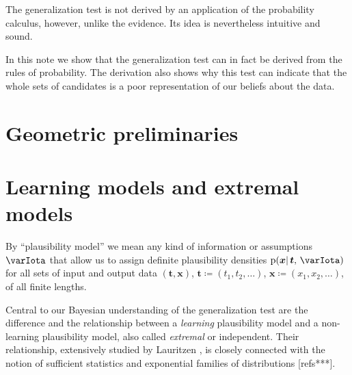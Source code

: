 \documentclass[\ifafour a4paper,12pt,\else a5paper,10pt,\fi%
onecolumn,oneside,article,%
british%
]{memoir}
\theoremstyle{remark}
\theoremstyle{innote}
\newcommand*{\citey}{\parencites*}
\newcommand*{\defd}{\coloneqq}
\newcommand*{\pf}{\mathrm{p}}%
\renewcommand*{\|}{\mathpunct{|}}
\newcommand*{\yI}{\varIota}
\newcommand*{\yt}{\bm{t}}
\newcommand*{\yx}{\bm{x}}
\begin{document}
\bigskip

The generalization test is not derived by an application of the probability
calculus, however, unlike the evidence. Its idea is nevertheless intuitive and
sound.

In this note we show that the generalization test can in fact be derived
from the rules of probability. The derivation also shows why this test can
indicate that the whole sets of candidates is a poor representation of our
beliefs about the data.

\section{Geometric preliminaries}
\label{sec:geom_prelim}

\section{Learning models and extremal models}
\label{sec:learning_extremal}

By \enquote{plausibility model} we mean any kind of information or
assumptions $\yI$ that allow us to assign definite plausibility densities
$\pf(\yx \| \yt,\, \yI)$ for all sets of input and output data
$(\yt, \yx)$, $\yt\defd (t_1, t_2, \dotsc)$,
$\yx \defd (x_1, x_2, \dotsc)$, of all finite lengths.

Central to our Bayesian understanding of the generalization test are the
difference and the relationship between a \emph{learning} plausibility
model and a non-learning plausibility model, also called \emph{extremal} or
independent. Their relationship, extensively studied by Lauritzen
\citey{lauritzen1974,lauritzen1974_r1974,lauritzen1982_r1988,lauritzen1984},
is closely connected with the notion of sufficient statistics and
exponential families of distributions [refs***].
\end{document}

